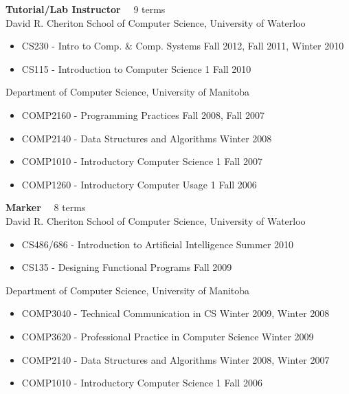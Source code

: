 \documentclass[line,margin]{res}
\begin{document}
\begin{resume}
  {\bf Tutorial/Lab Instructor} ~~9 terms \vspace{4pt} \\
  David R. Cheriton School of Computer Science, University of Waterloo
  \begin{itemize}  \itemsep -2pt %
    \item CS230 - Intro to Comp. \& Comp. Systems \hfill Fall 2012, Fall 2011, Winter 2010
    \item CS115 - Introduction to Computer Science 1 \hfill Fall 2010
  \end{itemize} \vspace{-4pt}
  Department of Computer Science, University of Manitoba
  \begin{itemize}  \itemsep -2pt %
    \item COMP2160 - Programming Practices \hfill Fall 2008, Fall 2007
    \item COMP2140 - Data Structures and Algorithms \hfill Winter 2008
    \item COMP1010 - Introductory Computer Science 1 \hfill Fall 2007
    \item COMP1260 - Introductory Computer Usage 1 \hfill Fall 2006
  \end{itemize}
  
  {\bf Marker} ~~8 terms \vspace{4pt} \\
  David R. Cheriton School of Computer Science, University of Waterloo
  \begin{itemize}  \itemsep -2pt %
    \item CS486/686 - Introduction to Artificial Intelligence \hfill Summer 2010
    \item CS135 - Designing Functional Programs \hfill Fall 2009
  \end{itemize} \vspace{-4pt}
  Department of Computer Science, University of Manitoba
  \begin{itemize}  \itemsep -2pt %
    \item COMP3040 - Technical Communication in CS \hfill Winter 2009, Winter 2008
    \item COMP3620 - Professional Practice in Computer Science \hfill Winter 2009
    \item COMP2140 - Data Structures and Algorithms \hfill Winter 2008, Winter 2007
    \item COMP1010 - Introductory Computer Science 1 \hfill Fall 2006
  \end{itemize}


\end{resume}
\end{document}

